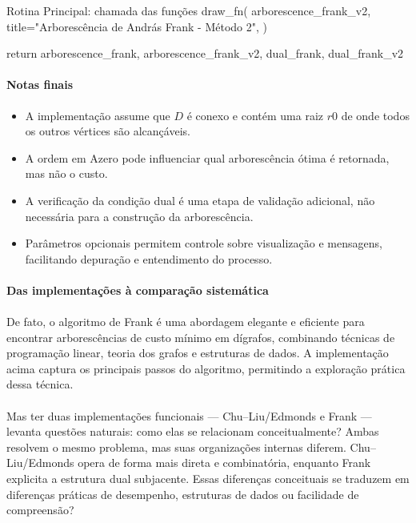 \documentclass[12pt,a4paper]{article}
\def\texttt#1{#1}%
\def\emph#1{#1}%
\def\_{}%
\begin{document}
\begin{pybox}{Rotina Principal: chamada das funções}
                    draw_fn(
                        arborescence_frank_v2,
                        title="Arborescência de András Frank - Método 2",
                    )

    return arborescence_frank, arborescence_frank_v2, dual_frank, dual_frank_v2
\end{pybox}

\paragraph{Notas finais}
\begin{itemize}\setlength{\itemsep}{2pt}
    \item A implementação assume que \(D\) é conexo e contém uma raiz \(r0\) de onde todos os outros vértices são alcançáveis.
    \item A ordem em \texttt{A\_zero} pode influenciar qual arborescência ótima é retornada, mas não o custo.
    \item A verificação da condição dual é uma etapa de validação adicional, não necessária para a construção da arborescência.
    \item Parâmetros opcionais permitem controle sobre visualização e mensagens, facilitando depuração e entendimento do processo.
\end{itemize}

\paragraph{Das implementações à comparação sistemática}
\paragraph{}
De fato, o algoritmo de Frank é uma abordagem elegante e eficiente para encontrar arborescências de custo mínimo em dígrafos, combinando técnicas de programação linear, teoria dos grafos e estruturas de dados. A implementação acima captura os principais passos do algoritmo, permitindo a exploração prática dessa técnica.

\paragraph{}
Mas ter duas implementações funcionais — Chu–Liu/Edmonds e Frank — levanta questões naturais: \emph{como elas se relacionam conceitualmente?} Ambas resolvem o mesmo problema, mas suas organizações internas diferem. Chu–Liu/Edmonds opera de forma mais direta e combinatória, enquanto Frank explicita a estrutura dual subjacente. Essas diferenças conceituais se traduzem em diferenças práticas de desempenho, estruturas de dados ou facilidade de compreensão?
\end{document}

